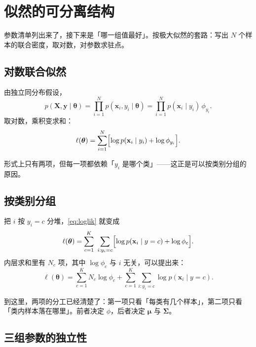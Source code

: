 \documentclass[11pt,a4paper,fontset=windows,zihao=-4]{ctexart}
\newcommand{\bX}{\mathbf{X}}
\newcommand{\by}{\mathbf{y}}
\newcommand{\bx}{\mathbf{x}}
\newcommand{\bSigma}{\boldsymbol{\Sigma}}
\newcommand{\bmu}{\boldsymbol{\mu}}
\newcommand{\btheta}{\boldsymbol{\theta}}
\begin{document}

\section{似然的可分离结构}

参数清单列出来了，接下来是「哪一组值最好」。按极大似然的套路：写出 $N$ 个样本的联合密度，取对数，对参数求驻点。

\subsection{对数联合似然}

由独立同分布假设，
\begin{equation}
  p(\bX,\by\mid\btheta)=\prod_{i=1}^{N}p(\bx_i,y_i\mid\btheta)
  =\prod_{i=1}^{N}p(\bx_i\mid y_i)\,\phi_{y_i}.
\end{equation}
取对数，乘积变求和：
\begin{equation}
  \ell(\btheta)=\sum_{i=1}^{N}\Bigl[\log p(\bx_i\mid y_i)+\log\phi_{y_i}\Bigr].
  \label{eq:loglik}
\end{equation}

形式上只有两项，但每一项都依赖「$y_i$ 是哪个类」——这正是可以按类别分组的原因。

\subsection{按类别分组}

把 $i$ 按 $y_i=c$ 分堆，\eqref{eq:loglik} 就变成
\begin{equation}
  \ell(\btheta)=\sum_{c=1}^{K}\ \sum_{i:y_i=c}\Bigl[\log p(\bx_i\mid y=c)+\log\phi_c\Bigr].
  \label{eq:group}
\end{equation}
内层求和里有 $N_c$ 项，其中 $\log\phi_c$ 与 $i$ 无关，可以提出来：
\begin{equation}
  \ell(\btheta)=\sum_{c=1}^{K}N_c\log\phi_c+\sum_{c=1}^{K}\sum_{i:y_i=c}\log p(\bx_i\mid y=c).
  \label{eq:group2}
\end{equation}

到这里，两项的分工已经清楚了：第一项只看「每类有几个样本」，第二项只看「类内样本落在哪里」。前者决定 $\phi$，后者决定 $\bmu$ 与 $\bSigma$。

\subsection{三组参数的独立性}
\end{document}
